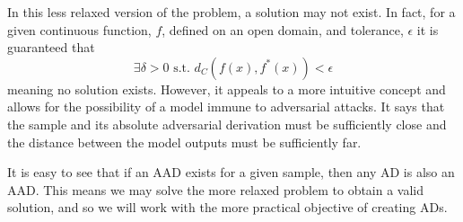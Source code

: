 In this less relaxed version of the problem, a solution may not exist.  In fact, for a given continuous function, $f$, defined on an open domain, and tolerance, $\epsilon$ it is guaranteed that $$\exists \delta > 0 \text{ s.t. } d_C(f(x),f^*(x)) < \epsilon$$ meaning no solution exists.  However, it appeals to a more intuitive concept and allows for the possibility of a model immune to adversarial attacks.  It says that the sample and its absolute adversarial derivation must be sufficiently close and the distance between the model outputs must be sufficiently far.  

It is easy to see that if an AAD exists for a given sample, then any AD is also an AAD.  This means we may solve the more relaxed problem to obtain a valid solution, and so we will work with the more practical objective of creating ADs.

